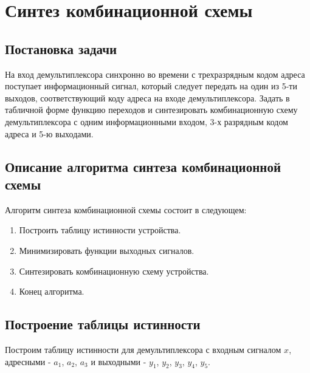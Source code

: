 \section{Синтез комбинационной схемы}

\subsection{Постановка задачи}

На вход демультиплексора синхронно во времени с трехразрядным кодом адреса поступает информационный сигнал, 
который следует передать на один из 5-ти выходов, соответствующий коду адреса на входе демультиплексора. 
Задать в табличной форме функцию переходов и синтезировать 
комбинационную схему демультиплексора с одним информационными входом, 3-х разрядным кодом адреса и 5-ю выходами.

\subsection{Описание алгоритма синтеза комбинационной схемы}

Алгоритм синтеза комбинационной схемы состоит в следующем:

\begin{enumerate}
    \item Построить таблицу истинности устройства.

    \item Минимизировать функции выходных сигналов.

    \item Синтезировать комбинационную схему устройства.
    
    \item Конец алгоритма.
\end{enumerate}

\subsection{Построение таблицы истинности}

Построим таблицу истинности для демультиплексора с входным сигналом $x$, адресными - $a_1$, $a_2$, $a_3$ и выходными - 
$y_1$, $y_2$, $y_3$, $y_4$, $y_5$.

